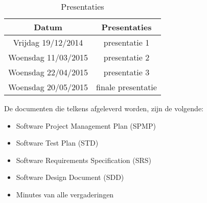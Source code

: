 \begin{table}[h]

\begin{tabular}{c|c}
\hline
\textbf{Datum} & \textbf{Presentaties}\\
 \hline
 Vrijdag 19/12/2014 & presentatie 1 \\
 \hline \hline
Woensdag 11/03/2015 & presentatie 2\\
Woensdag 22/04/2015 & presentatie 3\\
Woensdag 20/05/2015 & finale presentatie\\
\end{tabular}
\caption{Presentaties}
\label{tab:pres}
\end{table}

\begin{comment}
\begin{table}[h]

\begin{tabular}{|l|c|}
\hline
\textbf{Datum} & \textbf{To Do}\\
\hline
 Woensdag 05/11/2014 & inleveren SPMP \\
Woensdag 19/11/2014 & eerste versie documenten \\
Maandag 15/12/2014 & Einde iteratie 1: opleveren code en documenten \\
Vrijdag 19/12/2014 & presentatie \\
\hline \hline
Dinsdag 03/03/2015 & Einde iteratie 2: opleveren code en documenten \\
Woensdag 11/03/2015 & presentatie\\
Maandag 20/04/2015 & Einde iteratie 3: opleveren code en documenten \\
Woensdag 22/04/2015 & presentatie \\
Vrijdag 15/05/2015 & Einde iteratie 4: finale oplevering\\
Woensdag 20/05/2015 & finale presentatie\\
\hline
\end{tabular}

\caption{Kalender}
\label{tab:kalender}
\end{table}
\end{comment}

\newpage

De documenten die telkens afgeleverd worden, zijn de volgende:

\begin{itemize}
\item Software Project Management Plan (SPMP)
\item Software Test Plan (STD)
\item Software Requirements Specification (SRS)
\item Software Design Document (SDD)
\item Minutes van alle vergaderingen
\end{itemize}

